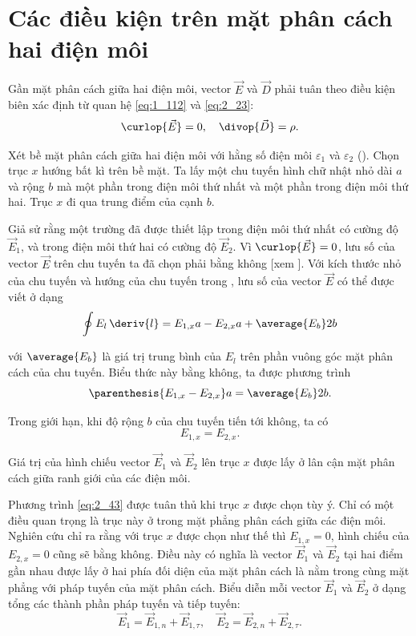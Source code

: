 \section{Các điều kiện trên mặt phân cách hai điện môi}\label{sec:2_7}

Gần mặt phân cách giữa hai điện môi, vector $\vec{E}$ và $\vec{D}$ phải tuân theo điều kiện biên xác định từ quan hệ \eqref{eq:1_112} và \eqref{eq:2_23}:
\begin{equation*}
    \curlop{\vec{E}} = 0,\quad \divop{\vec{D}} = \rho.
\end{equation*}

Xét bề mặt phân cách giữa hai điện môi với hằng số điện môi $\varepsilon_1$ và $\varepsilon_2$ (). Chọn trục $x$ hướng bất kì trên bề mặt. Ta lấy một chu tuyến hình chữ nhật nhỏ dài $a$ và rộng $b$ mà một phần trong điện môi thứ nhất và một phần trong điện môi thứ hai. Trục $x$ đi qua trung điểm của cạnh $b$.

Giả sử rằng một trường đã được thiết lập trong điện môi thứ nhất có cường độ $\vec{E}_1$, và trong điện môi thứ hai có cường độ $\vec{E}_2$. Vì $\curlop{\vec{E}}=0$, lưu số của vector $\vec{E}$ trên chu tuyến ta đã chọn phải bằng không [xem ]. Với kích thước nhỏ của chu tuyến và hướng của chu tuyến trong , lưu số của vector $\vec{E}$ có thể được viết ở dạng
\begin{equation}\label{eq:2_42}
    \oint E_l\,\deriv{l} = E_{1,x} a - E_{2,x} a + \average{E_b} 2b
\end{equation}

\noindent
với $\average{E_b}$ là giá trị trung bình của $E_l$ trên phần vuông góc mặt phân cách của chu tuyến. Biểu thức này bằng không, ta được phương trình
\begin{equation*}
    \parenthesis{E_{1,x} - E_{2,x}} a = \average{E_b} 2b.
\end{equation*}

\noindent
Trong giới hạn, khi độ rộng $b$ của chu tuyến tiến tới không, ta có
\begin{equation}\label{eq:2_43}
    E_{1,x} = E_{2,x}.
\end{equation}

\noindent
Giá trị của hình chiếu vector $\vec{E}_1$ và $\vec{E}_2$ lên trục $x$ được lấy ở lân cận mặt phân cách giữa ranh giới của các điện môi.

Phương trình \eqref{eq:2_43} được tuân thủ khi trục $x$ được chọn tùy ý. Chỉ có một điều quan trọng là trục này ở trong mặt phẳng phân cách giữa các điện môi. Nghiên cứu  chỉ ra rằng với trục $x$ được chọn như thế thì $E_{1,x}=0$, hình chiếu của $E_{2,x}=0$ cũng sẽ bằng không. Điều này có nghĩa là vector $\vec{E}_1$ và $\vec{E}_2$ tại hai điểm gần nhau được lấy ở hai phía đối diện của mặt phân cách là nằm trong cùng mặt phẳng với pháp tuyến của mặt phân cách. Biểu diễn mỗi vector $\vec{E}_1$ và $\vec{E}_2$ ở dạng tổng các thành phần pháp tuyến và tiếp tuyến:
\begin{equation*}
    \vec{E}_1 = \vec{E}_{1,n} + \vec{E}_{1,\tau},\quad \vec{E}_2 = \vec{E}_{2,n} + \vec{E}_{2,\tau}.
\end{equation*}

